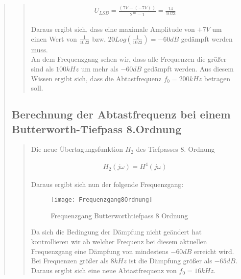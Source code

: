 \begin{quote}
\begin{quote}
	   \begin{equation*}
        	\begin{split}
        		U_{LSB} = \frac{(7V-(-7V))}{2^{10}-1} = \frac{14}{1023}
        	\end{split}
        \end{equation*}
        
        Daraus ergibt sich, dass eine maximale Amplitude von $+7V$ um einen Wert von $\frac{1}{1023}$ bzw. $20
        Log(\frac{1}{1023}) = -60 dB$ gedämpft werden muss. \\
        An dem Frequenzgang sehen wir, dass alle Frequenzen die größer sind als $100kHz$ um mehr als $-60 dB$ gedämpft
        werden. Aus diesem Wissen ergibt sich, dass die Abtastfrequenz $f_0 = 200kHz$ betragen soll.
        
    \end{quote}
    
    \subsection{Berechnung der Abtastfrequenz bei einem Butterworth-Tiefpass 8.Ordnung}
    \begin{quote}
        Die neue Übertagungsfunktion $H_2$ des Tiefpasses 8. Ordnung
        
        \begin{equation*}
        	\begin{split}
        		H_2(j\omega) = H^4 (j\omega)
        	\end{split}
        \end{equation*}
        
        Daraus ergibt sich nun der folgende Frequenzgang:
        
        \begin{figure}[H]
			\centering
				\texttt{[image: Frequenzgang8Ordnung]}
				   \caption{Frequenzgang Butterworthtiefpass 8 Ordnung}
		\end{figure}
		\vspace{1em}
	 	
	 	Da sich die Bedingung der Dämpfung nicht geändert hat kontrollieren wir ab welcher Frequenz bei diesem aktuellen
	 	Frequenzgang eine Dämpfung von mindestens $-60 dB$ erreicht wird.\\
	 	Bei Frequenzen größer als $8kHz$ ist die Dämpfung größer als $-65 dB$. Daraus ergibt sich eine neue Abtastfrequenz
	 	von $f_0 = 16kHz$.
    \end{quote}
    

\end{quote}
